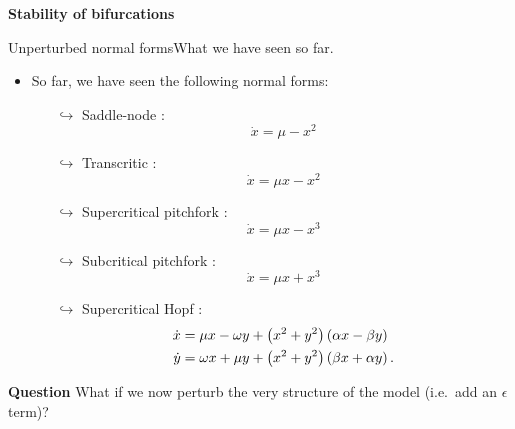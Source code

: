 \documentclass[usenames,dvipsnames,svgnames,10pt,aspectratio=169]{beamer}
\begin{document}
\begin{frame}[t, c]{}
	\centering
	\vspace{1cm}

	{\Large \textbf{Stability of bifurcations}}

	\bigskip

	{}

\end{frame}

\begin{frame}[t, c]{Unperturbed normal forms}{What we have seen so far.}
	\centering
	\begin{itemize}
		\item So far, we have seen the following normal forms:
		\begin{itemize}
			\item[$\hookrightarrow$] Saddle-node :
			$$\dot{x} = \mu - x^2$$

			\item[$\hookrightarrow$] Transcritic :
			$$\dot{x} = \mu x- x^2$$

			\item[$\hookrightarrow$] Supercritical pitchfork :
			$$\dot{x} = \mu x - x^3$$

			\item[$\hookrightarrow$] Subcritical pitchfork :
			$$\dot{x} = \mu x + x^3$$

			\item[$\hookrightarrow$] Supercritical Hopf :
			\begin{equation}
				\begin{aligned}
					\dot{x} & = \mu x - \omega y + \left(x^2 + y^2 \right) \left(\alpha x - \beta y \right) \\
					\dot{y} & = \omega x + \mu y + \left(x^2 + y^2 \right) \left(\beta x + \alpha y \right).
				\end{aligned}
				\notag
			\end{equation}
		\end{itemize}
	\end{itemize}

	\vspace{1cm}
\end{frame}

\begin{frame}[t, c]{}{}

	\begin{block}{\centering \textbf{Question}}
		\centering
		What if we now perturb the very structure of the model (i.e.\ add an $\epsilon$ term)?
	\end{block}

	\vspace{-1cm}
\end{frame}
\end{document}
